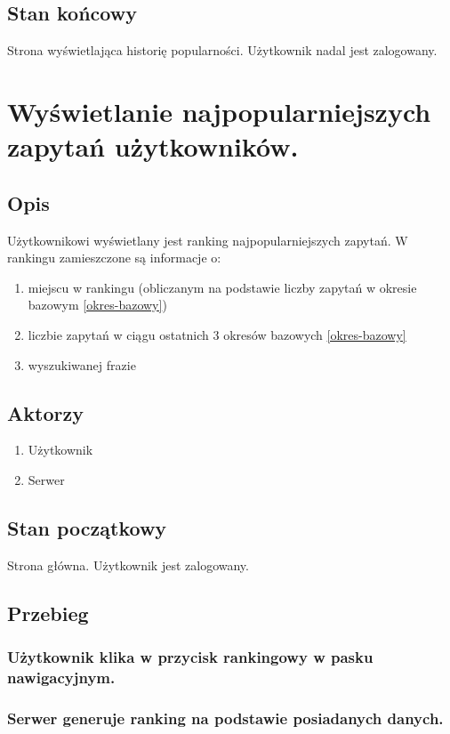 \documentclass[a4paper]{article}
\begin{document}
\subsection*{Stan końcowy}

Strona wyświetlająca historię popularności. Użytkownik nadal jest zalogowany.

\newpage

\section{Wyświetlanie najpopularniejszych zapytań użytkowników.}
\subsection*{Opis}
Użytkownikowi wyświetlany jest ranking najpopularniejszych zapytań. W rankingu zamieszczone są informacje o:
\begin{enumerate}
\item miejscu w rankingu (obliczanym na podstawie liczby zapytań w okresie bazowym \ref{okres-bazowy})
\item liczbie zapytań w ciągu ostatnich 3 okresów bazowych \ref{okres-bazowy}
\item wyszukiwanej frazie
\end{enumerate}

\subsection*{Aktorzy}
\begin{enumerate}
\item Użytkownik
\item Serwer

\end{enumerate}

\subsection*{Stan początkowy}
Strona główna. Użytkownik jest zalogowany.

\subsection{Przebieg}
\subsubsection{Użytkownik klika w przycisk rankingowy w pasku nawigacyjnym. }
\subsubsection{Serwer generuje ranking na podstawie posiadanych danych.}
\end{document}
